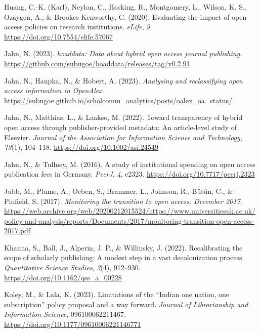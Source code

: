 \documentclass[a4paper,man,floatsintext,longtable,noextraspace,12pt]{apa6}
\newenvironment{CSLReferences}%
  {}%
  {\par}
\begin{document}
\begin{CSLReferences}{1}{0}
\leavevmode{}%
Huang, C.-K. (Karl), Neylon, C., Hosking, R., Montgomery, L., Wilson, K.
S., Ozaygen, A., \& Brookes-Kenworthy, C. (2020). Evaluating the impact
of open access policies on research institutions. \emph{{eLife}},
\emph{9}. \url{https://doi.org/10.7554/elife.57067}

\leavevmode{}%
Jahn, N. (2023). \emph{{hoaddata}: Data about hybrid open access journal
publishing}.
\url{https://github.com/subugoe/hoaddata/releases/tag/v0.2.91}

\leavevmode{}%
Jahn, N., Haupka, N., \& Hobert, A. (2023). \emph{Analysing and
reclassifying open access information in OpenAlex}.
\url{https://subugoe.github.io/scholcomm_analytics/posts/oalex_oa_status/}

\leavevmode{}%
Jahn, N., Matthias, L., \& Laakso, M. (2022). Toward transparency of
hybrid open access through publisher-provided metadata: An article-level
study of {Elsevier}. \emph{Journal of the Association for Information
Science and Technology}, \emph{73}(1), 104--118.
\url{https://doi.org/10.1002/asi.24549}

\leavevmode{}%
Jahn, N., \& Tullney, M. (2016). A study of institutional spending on
open access publication fees in {Germany}. \emph{{PeerJ}}, \emph{4},
e2323. \url{https://doi.org/10.7717/peerj.2323}

\leavevmode{}%
Jubb, M., Plume, A., Oeben, S., Brammer, L., Johnson, R., Bütün, C., \&
Pinfield, S. (2017). \emph{Monitoring the transition to open access:
December 2017}.
\url{https://web.archive.org/web/20200212015524/https://www.universitiesuk.ac.uk/policy-and-analysis/reports/Documents/2017/monitoring-transition-open-access-2017.pdf}

\leavevmode{}%
Khanna, S., Ball, J., Alperin, J. P., \& Willinsky, J. (2022).
Recalibrating the scope of scholarly publishing: A modest step in a vast
decolonization process. \emph{Quantitative Science Studies},
\emph{3}(4), 912--930. \url{https://doi.org/10.1162/qss_a_00228}

\leavevmode{}%
Koley, M., \& Lala, K. (2023). Limitations of the {{``Indian one nation,
one subscription''}} policy proposal and a way forward. \emph{Journal of
Librarianship and Information Science}, 096100062211467.
\url{https://doi.org/10.1177/09610006221146771}


\end{CSLReferences}
\end{document}
